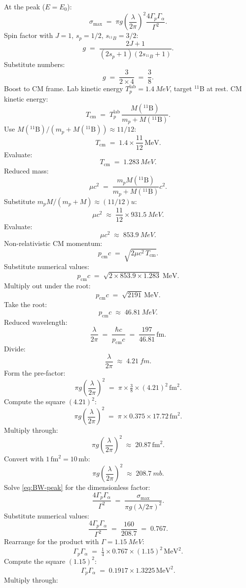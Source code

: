 \documentclass[11pt]{article}
\begin{document}
At the peak ($E=E_{0}$):
\begin{equation}
\sigma_{\max}\;=\;\pi g\!\left(\frac{\lambda}{2\pi}\right)^{2}\frac{4\Gamma_{p}\Gamma_{\alpha}}{\Gamma^{2}}.
\label{eq:BW-peak}
\end{equation}
Spin factor with $J=1$, $s_{p}=1/2$, $s_{^{11}\!B}=3/2$:
\[
g\;=\;\frac{2J+1}{(2s_{p}+1)(2s_{^{11}\!B}+1)}.
\]
Substitute numbers:
\[
g\;=\;\frac{3}{2\times 4}\;=\;\frac{3}{8}.
\]
Boost to CM frame. Lab kinetic energy $T_{p}^\text{lab}=\SI{1.4}{MeV}$, target $^{11}$B at rest. CM kinetic energy:
\[
T_\text{cm}\;=\;T_{p}^\text{lab}\,\frac{M(^{11}\!\text{B})}{m_{p}+M(^{11}\!\text{B})}.
\]
Use $M(^{11}\!\text{B})/(m_{p}+M(^{11}\!\text{B}))\approx 11/12$:
\[
T_\text{cm}\;=\;1.4\times\frac{11}{12}\,\text{MeV}.
\]
Evaluate:
\[
T_\text{cm}\;=\;\SI{1.283}{MeV}.
\]
Reduced mass:
\[
\mu c^{2}\;=\;\frac{m_{p}M(^{11}\!\text{B})}{m_{p}+M(^{11}\!\text{B})}c^{2}.
\]
Substitute $m_{p}M/(m_{p}+M)\approx (11/12)u$:
\[
\mu c^{2}\;\approx\;\frac{11}{12}\times\SI{931.5}{MeV}.
\]
Evaluate:
\[
\mu c^{2}\;\approx\;\SI{853.9}{MeV}.
\]
Non-relativistic CM momentum:
\[
p_\text{cm}c\;=\;\sqrt{2\mu c^{2}\,T_\text{cm}}.
\]
Substitute numerical values:
\[
p_\text{cm}c\;=\;\sqrt{2\times 853.9\times 1.283}\;\text{MeV}.
\]
Multiply out under the root:
\[
p_\text{cm}c\;=\;\sqrt{2191}\,\text{MeV}.
\]
Take the root:
\[
p_\text{cm}c\;\approx\;\SI{46.81}{MeV}.
\]
Reduced wavelength:
\[
\frac{\lambda}{2\pi}\;=\;\frac{\hbar c}{p_\text{cm}c}\;=\;\frac{197}{46.81}\,\text{fm}.
\]
Divide:
\[
\frac{\lambda}{2\pi}\;\approx\;\SI{4.21}{fm}.
\]
Form the pre-factor:
\[
\pi g\!\left(\frac{\lambda}{2\pi}\right)^{2}\;=\;\pi\times\tfrac{3}{8}\times(4.21)^{2}\,\text{fm}^{2}.
\]
Compute the square $(4.21)^{2}$:
\[
\pi g\!\left(\frac{\lambda}{2\pi}\right)^{2}\;=\;\pi\times 0.375\times 17.72\,\text{fm}^{2}.
\]
Multiply through:
\[
\pi g\!\left(\frac{\lambda}{2\pi}\right)^{2}\;\approx\;20.87\,\text{fm}^{2}.
\]
Convert with $1\,\text{fm}^{2}=10\,\text{mb}$:
\[
\pi g\!\left(\frac{\lambda}{2\pi}\right)^{2}\;\approx\;\SI{208.7}{mb}.
\]
Solve \eqref{eq:BW-peak} for the dimensionless factor:
\[
\frac{4\Gamma_{p}\Gamma_{\alpha}}{\Gamma^{2}}\;=\;\frac{\sigma_{\max}}{\pi g(\lambda/2\pi)^{2}}.
\]
Substitute numerical values:
\[
\frac{4\Gamma_{p}\Gamma_{\alpha}}{\Gamma^{2}}\;=\;\frac{160}{208.7}\;=\;0.767.
\]
Rearrange for the product with $\Gamma=\SI{1.15}{MeV}$:
\[
\Gamma_{p}\Gamma_{\alpha}\;=\;\tfrac{1}{4}\times 0.767\times(1.15)^{2}\,\text{MeV}^{2}.
\]
Compute the square $(1.15)^{2}$:
\[
\Gamma_{p}\Gamma_{\alpha}\;=\;0.1917\times 1.3225\,\text{MeV}^{2}.
\]
Multiply through:
\end{document}

